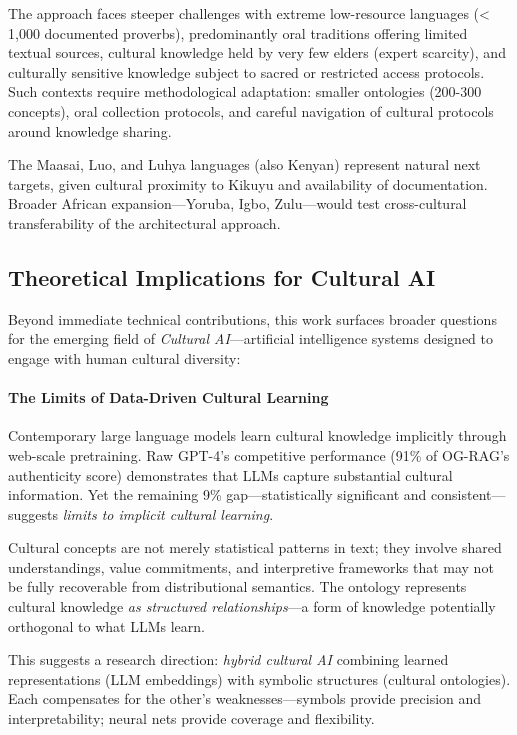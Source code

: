 The approach faces steeper challenges with extreme low-resource languages (< 1,000 documented proverbs), predominantly oral traditions offering limited textual sources, cultural knowledge held by very few elders (expert scarcity), and culturally sensitive knowledge subject to sacred or restricted access protocols. Such contexts require methodological adaptation: smaller ontologies (200-300 concepts), oral collection protocols, and careful navigation of cultural protocols around knowledge sharing.

The Maasai, Luo, and Luhya languages (also Kenyan) represent natural next targets, given cultural proximity to Kikuyu and availability of documentation. Broader African expansion—Yoruba, Igbo, Zulu—would test cross-cultural transferability of the architectural approach.

\subsection{Theoretical Implications for Cultural AI}
\label{subsec:theoretical_implications}

Beyond immediate technical contributions, this work surfaces broader questions for the emerging field of \emph{Cultural AI}—artificial intelligence systems designed to engage with human cultural diversity:

\paragraph{The Limits of Data-Driven Cultural Learning}

Contemporary large language models learn cultural knowledge implicitly through web-scale pretraining. Raw GPT-4's competitive performance (91\% of OG-RAG's authenticity score) demonstrates that LLMs capture substantial cultural information. Yet the remaining 9\% gap—statistically significant and consistent—suggests \emph{limits to implicit cultural learning}.

Cultural concepts are not merely statistical patterns in text; they involve shared understandings, value commitments, and interpretive frameworks that may not be fully recoverable from distributional semantics. The ontology represents cultural knowledge \emph{as structured relationships}—a form of knowledge potentially orthogonal to what LLMs learn.

This suggests a research direction: \emph{hybrid cultural AI} combining learned representations (LLM embeddings) with symbolic structures (cultural ontologies). Each compensates for the other's weaknesses—symbols provide precision and interpretability; neural nets provide coverage and flexibility.

